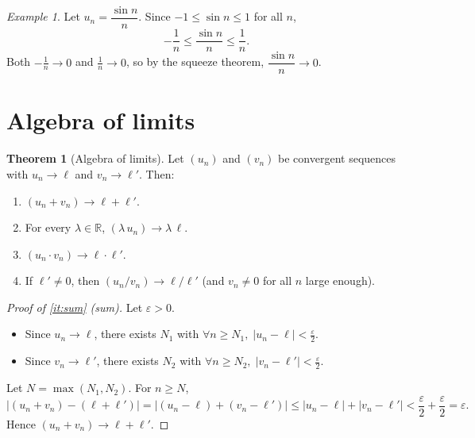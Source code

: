 \documentclass[12pt,a4paper,openany]{book}
\newcommand{\R}{\mathbb{R}}
\newcommand{\eps}{\varepsilon}
\newcommand{\abs}[1]{\left\lvert #1 \right\rvert}
\theoremstyle{definition}
\newtheorem{theorem}{Theorem}[chapter]
\theoremstyle{remark}
\newtheorem{example}{Example}[chapter]
\begin{document}
\begin{example}\label{ex:squeeze-application}
Let $u_n = \dfrac{\sin n}{n}$. Since $-1 \leq \sin n \leq 1$ for all $n$,
\[
   -\frac{1}{n} \leq \frac{\sin n}{n} \leq \frac{1}{n}.
\]
Both $-\frac{1}{n} \to 0$ and $\frac{1}{n} \to 0$, so by the squeeze theorem,
$\dfrac{\sin n}{n} \to 0$.
\end{example}

\section{Algebra of limits}\label{sec:algebra-limits}

\begin{theorem}[Algebra of limits]\label{thm:algebra-limits}
Let $(u_n)$ and $(v_n)$ be convergent sequences with $u_n \to \ell$ and
$v_n \to \ell'$. Then:
\begin{enumerate}
\item\label{it:sum} $(u_n + v_n) \to \ell + \ell'$.
\item\label{it:scalar} For every $\lambda \in \R$, $(\lambda\, u_n) \to \lambda\,\ell$.
\item\label{it:product} $(u_n \cdot v_n) \to \ell \cdot \ell'$.
\item\label{it:quotient} If $\ell' \neq 0$, then $(u_n / v_n) \to \ell / \ell'$
      (and $v_n \neq 0$ for all $n$ large enough).
\end{enumerate}
\end{theorem}

\begin{proof}[Proof of \ref{it:sum} (sum)]
Let $\eps > 0$.
\begin{itemize}
\item Since $u_n \to \ell$, there exists $N_1$ with
      $\forall n \geq N_1,\; \abs{u_n - \ell} < \frac{\eps}{2}$.
\item Since $v_n \to \ell'$, there exists $N_2$ with
      $\forall n \geq N_2,\; \abs{v_n - \ell'} < \frac{\eps}{2}$.
\end{itemize}
Let $N = \max(N_1, N_2)$. For $n \geq N$,
\[
   \abs{(u_n + v_n) - (\ell + \ell')}
   = \abs{(u_n - \ell) + (v_n - \ell')}
   \leq \abs{u_n - \ell} + \abs{v_n - \ell'}
   < \frac{\eps}{2} + \frac{\eps}{2} = \eps.
\]
Hence $(u_n + v_n) \to \ell + \ell'$.
\end{proof}
\end{document}
